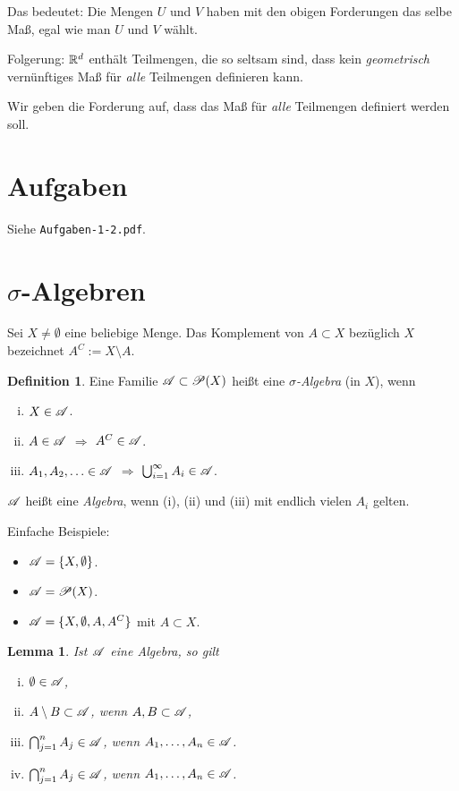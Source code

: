 \documentclass[
 a4paper,
 12pt,
 parskip=half
 ]{scrreprt}
\theoremstyle{plain}
\newtheorem{lem}[thm]{Lemma}
\theoremstyle{definition}
\newtheorem{defn}[thm]{Definition}
\numberwithin{equation}{section}
\begin{document}
Das bedeutet: Die Mengen $U$ und $V$ haben mit den obigen Forderungen das selbe Maß, egal wie man $U$ und $V$ wählt.

Folgerung: $\mathbb{R}^d$ enthält Teilmengen, die so seltsam sind, dass kein \emph{geometrisch} vernünftiges Maß für \emph{alle} Teilmengen definieren kann.

Wir geben die Forderung auf, dass das Maß für \emph{alle} Teilmengen definiert werden soll.

\section{Aufgaben}
 Siehe \verb+Aufgaben-1-2.pdf+.

\section{\texorpdfstring{$\sigma$}{Sigma}-Algebren}
Sei $X \ne \emptyset$ eine beliebige Menge. Das Komplement von $A \subset X$ bezüglich $X$ bezeichnet $A^C := X \setminus A$.

\begin{defn}
 Eine Familie $\mathscr{A} \subset \mathscr{P}(X)$ heißt eine \emph{$\sigma$-Algebra} (in $X$), wenn
 \begin{enumerate}[(i)]
  \item $X \in \mathscr{A}$.
  \item $A \in \mathscr{A}$ $\Rightarrow$ $A^C \in \mathscr{A}$.
  \item $A_1, A_2, \ldots \in \mathscr{A}$ $\Rightarrow$ $\bigcup_{i=1}^\infty A_i \in \mathscr{A}$.
 \end{enumerate}
 $\mathscr{A}$ heißt eine \emph{Algebra}, wenn (i), (ii) und (iii) mit endlich vielen $A_i$ gelten.
\end{defn}

Einfache Beispiele:
\begin{itemize}
 \item $\mathscr{A} = \{ X, \emptyset \}$.
 \item $\mathscr{A} = \mathscr{P}( X )$.
 \item $\mathscr{A} = \{ X, \emptyset, A, A^C \}$ mit $A \subset X$.
\end{itemize}

\begin{lem}
 Ist $\mathscr{A}$ eine Algebra, so gilt
 \begin{enumerate}[(i)]
  \item $\emptyset \in \mathscr{A}$,
  \item $A \setminus B \subset \mathscr{A}$, wenn $A,B \subset \mathscr{A}$,
  \item $\bigcap_{j=1}^n A_j \in \mathscr{A}$, wenn $A_1, \ldots, A_n \in \mathscr{A}$.
  \item $\bigcap_{j=1}^n A_j \in \mathscr{A}$, wenn $A_1, \ldots, A_n \in \mathscr{A}$.
 \end{enumerate}
\end{lem}
\end{document}
